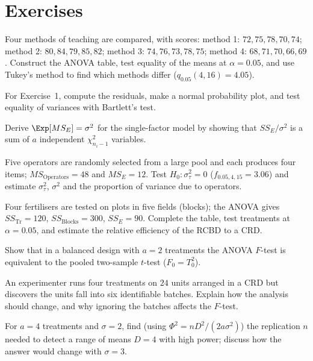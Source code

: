 \section{Exercises}

\begin{exercise}
Four methods of teaching are compared, with scores: method 1: $72,75,78,70,74$; method 2: $80,84,79,85,82$; method 3: $74,76,73,78,75$; method 4: $68,71,70,66,69$. Construct the ANOVA table, test equality of the means at $\alpha=0.05$, and use Tukey's method to find which methods differ ($q_{0.05}(4,16)=4.05$).
\end{exercise}

\begin{exercise}
For Exercise~1, compute the residuals, make a normal probability plot, and test equality of variances with Bartlett's test.
\end{exercise}

\begin{exercise}
Derive $\Exp[MS_E]=\sigma^2$ for the single-factor model by showing that $SS_E/\sigma^2$ is a sum of $a$ independent $\chi^2_{n_i-1}$ variables.
\end{exercise}

\begin{exercise}
Five operators are randomly selected from a large pool and each produces four items; $MS_{\mathrm{Operators}}=48$ and $MS_E=12$. Test $H_0:\sigma_\tau^2=0$ ($f_{0.05,4,15}=3.06$) and estimate $\sigma_\tau^2$, $\sigma^2$ and the proportion of variance due to operators.
\end{exercise}

\begin{exercise}
Four fertilisers are tested on plots in five fields (blocks); the ANOVA gives $SS_{\mathrm{Tr}}=120$, $SS_{\mathrm{Blocks}}=300$, $SS_E=90$. Complete the table, test treatments at $\alpha=0.05$, and estimate the relative efficiency of the RCBD to a CRD.
\end{exercise}

\begin{exercise}
Show that in a balanced design with $a=2$ treatments the ANOVA $F$-test is equivalent to the pooled two-sample $t$-test ($F_0=T_0^2$).
\end{exercise}

\begin{exercise}
An experimenter runs four treatments on $24$ units arranged in a CRD but discovers the units fall into six identifiable batches. Explain how the analysis should change, and why ignoring the batches affects the $F$-test.
\end{exercise}

\begin{exercise}
For $a=4$ treatments and $\sigma=2$, find (using $\Phi^2=nD^2/(2a\sigma^2)$) the replication $n$ needed to detect a range of means $D=4$ with high power; discuss how the answer would change with $\sigma=3$.
\end{exercise}
